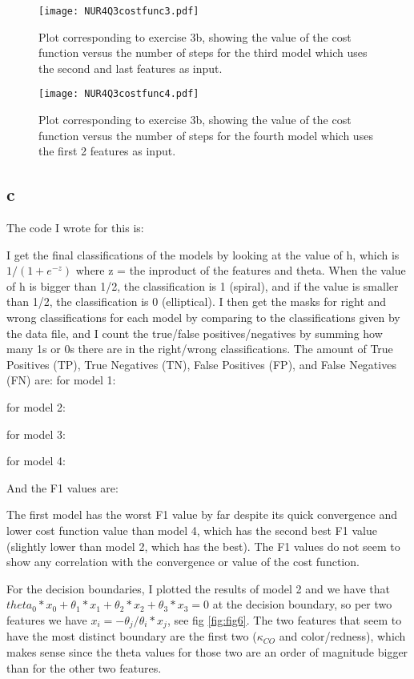 \begin{figure}[h!]
  \centering
  \texttt{[image: NUR4Q3costfunc3.pdf]}
  \caption{Plot corresponding to exercise 3b, showing the value of the cost function versus the number of steps for the third model which uses the second and last features as input.}
  \label{fig:fig4}
\end{figure} 


\begin{figure}[h!]
  \centering
  \texttt{[image: NUR4Q3costfunc4.pdf]}
  \caption{Plot corresponding to exercise 3b, showing the value of the cost function versus the number of steps for the fourth model which uses the first 2 features as input.}
  \label{fig:fig5}
\end{figure} 


\subsection*{c}

The code I wrote for this is:


I get the final classifications of the models by looking at the value of h, which is $1/(1+e^{-z})$ where z = the inproduct of the features and theta. 
When the value of h is bigger than 1/2, the classification is 1 (spiral), and if the value is smaller than 1/2, the classification is 0 (elliptical). 
I then get the masks for right and wrong classifications for each model by comparing to the classifications given by the data file, and I count the true/false positives/negatives by summing how many 1s or 0s there are in the right/wrong classifications. 
The amount of True Positives (TP), True Negatives (TN), False Positives (FP), and False Negatives (FN) are:
for model 1:

for model 2:

for model 3:

for model 4:

And the F1 values are:


The first model has the worst F1 value by far despite its quick convergence and lower cost function value than model 4, which has the second best F1 value (slightly lower than model 2, which has the best). The F1 values do not seem to show any correlation with the convergence or value of the cost function. 

For the decision boundaries, I plotted the results of model 2 and we have that $theta_0 * x_0 + \theta_1 * x_1 + \theta_2 * x_2 + \theta_3 * x_3 = 0$ at the decision boundary, so per two features we have $x_i = -\theta_j/\theta_i * x_j$, see fig \ref{fig:fig6}. The two features that seem to have the most distinct boundary are the first two ($\kappa_{CO}$ and color/redness), which makes sense since the theta values for those two are an order of magnitude bigger than for the other two features.

